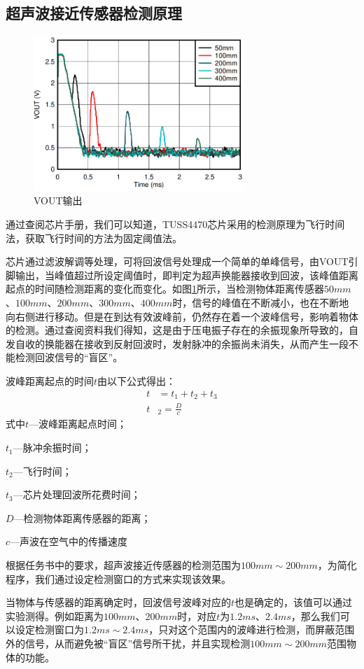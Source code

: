 \subsection{超声波接近传感器检测原理}
\begin{figure}[!h]
	\centering
	\includegraphics[width=8cm]{figure/VOUT image.png}
	\caption{VOUT输出}
	\label{VOUT输出}
\end{figure}\par
通过查阅芯片手册，我们可以知道，TUSS4470芯片采用的检测原理为飞行时间法，获取飞行时间的方法为固定阈值法。\par
芯片通过滤波解调等处理，可将回波信号处理成一个简单的单峰信号，由VOUT引脚输出，当峰值超过所设定阈值时，即判定为超声换能器接收到回波，该峰值距离起点的时间随检测距离的变化而变化。如图\ref{VOUT输出}所示，当检测物体距离传感器$50mm$、$100mm$、$200mm$、$300mm$、$400mm$时，信号的峰值在不断减小，也在不断地向右侧进行移动。但是在到达有效波峰前，仍然存在着一个波峰信号，影响着物体的检测。通过查阅资料我们得知，这是由于压电振子存在的余振现象所导致的，自发自收的换能器在接收到反射回波时，发射脉冲的余振尚未消失，从而产生一段不能检测回波信号的“盲区”。\par
波峰距离起点的时间$t$由以下公式得出：       
\begin{align}
	t&=t_1+t_2+t_3 \\
	t&_2=\frac{D}{c}
	\label{检测周期公式}
\end{align}  
式中\quad$t$---波峰距离起点时间；\par
\quad$t_1$---脉冲余振时间；\par
\quad$t_2$---飞行时间；\par    
\quad$t_3$---芯片处理回波所花费时间；\par 
\quad$D$---检测物体距离传感器的距离；\par  
\quad$c$---声波在空气中的传播速度\par    
根据任务书中的要求，超声波接近传感器的检测范围为$100mm\sim200mm$，为简化程序，我们通过设定检测窗口的方式来实现该效果。\par  
当物体与传感器的距离确定时，回波信号波峰对应的$t$也是确定的，该值可以通过实验测得。例如距离为$100mm$、$200mm$时，对应$t$为$1.2ms$、$2.4ms$，那么我们可以设定检测窗口为$1.2ms\sim2.4ms$，只对这个范围内的波峰进行检测，而屏蔽范围外的信号，从而避免被“盲区”信号所干扰，并且实现检测$100mm\sim200mm$范围物体的功能。\par
